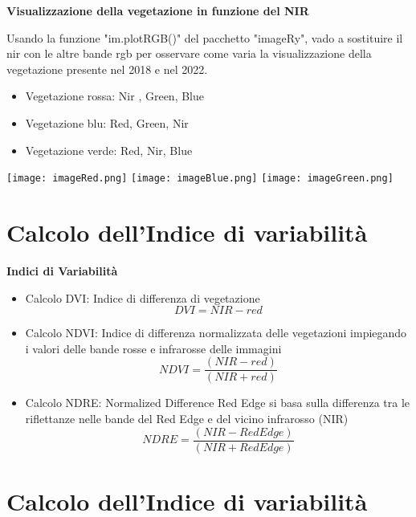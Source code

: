 \documentclass{beamer}
\begin{document}
\begin{frame}
{\Large\textbf{Visualizzazione della vegetazione in funzione del NIR}}

Usando la funzione "im.plotRGB()" del pacchetto "imageRy", vado a sostituire il nir con le altre bande rgb per osservare come varia la visualizzazione della vegetazione presente nel 2018 e nel 2022.
  \begin{itemize}
     \item Vegetazione rossa: Nir , Green, Blue 
     \item Vegetazione blu: Red, Green, Nir
     \item Vegetazione verde: Red, Nir, Blue
  \end{itemize}
    \centering
    \texttt{[image: imageRed.png]}
    \texttt{[image: imageBlue.png]}
    \texttt{[image: imageGreen.png]}
\end{frame}

\section{Calcolo dell'Indice di variabilità}

\begin{frame}
{\Large\textbf{Indici di Variabilità}}
\parbox{\linewidth}{
  \begin{itemize}
    \item  Calcolo DVI: Indice di differenza di vegetazione
    \begin{equation}
        DVI = NIR-red 
    \end{equation}
    \item Calcolo NDVI: Indice di differenza normalizzata delle vegetazioni impiegando i valori delle bande rosse e infrarosse delle immagini
    \begin{equation}
        NDVI = \frac{(NIR-red)}{(NIR+red)}
    \end{equation}
    \item Calcolo NDRE: Normalized Difference Red Edge si basa sulla differenza tra le riflettanze nelle bande del Red Edge e del vicino infrarosso (NIR)
    \begin{equation}
        NDRE = \frac{(NIR-Red Edge)}{(NIR+Red Edge)}
    \end{equation} 
  \end{itemize} 
}
\end{frame}

\section{Calcolo dell'Indice di variabilità}
\end{document}
